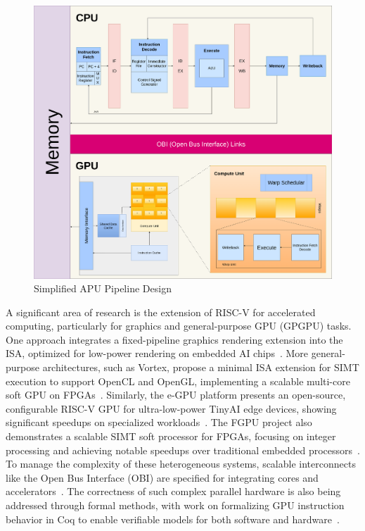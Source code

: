 \documentclass[conference]{IEEEtran}
\begin{document}
\begin{figure}[h]
    \centering
    \includegraphics[width=\textwidth]{../../pipeline_design.png}
    \caption{Simplified APU Pipeline Design}
    \label{fig:gpu_arch}
\end{figure}

A significant area of research is the extension of RISC-V for accelerated computing, particularly for graphics and general-purpose GPU (GPGPU) tasks. One approach integrates a fixed-pipeline graphics rendering extension into the ISA, optimized for low-power rendering on embedded AI chips~\cite{b8}. More general-purpose architectures, such as Vortex, propose a minimal ISA extension for SIMT execution to support OpenCL and OpenGL, implementing a scalable multi-core soft GPU on FPGAs~\cite{b2,b16}. Similarly, the e-GPU platform presents an open-source, configurable RISC-V GPU for ultra-low-power TinyAI edge devices, showing significant speedups on specialized workloads~\cite{b3}. The FGPU project also demonstrates a scalable SIMT soft processor for FPGAs, focusing on integer processing and achieving notable speedups over traditional embedded processors~\cite{b17}. To manage the complexity of these heterogeneous systems, scalable interconnects like the Open Bus Interface (OBI) are specified for integrating cores and accelerators~\cite{b18}. The correctness of such complex parallel hardware is also being addressed through formal methods, with work on formalizing GPU instruction behavior in Coq to enable verifiable models for both software and hardware~\cite{b15}.
\end{document}
